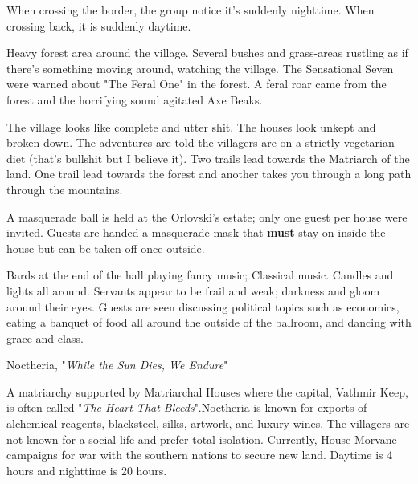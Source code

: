 
When crossing the border, the group notice it's suddenly nighttime. When crossing back, it is suddenly daytime.

	Heavy forest area around the village. Several bushes and grass-areas rustling as if there's something moving around, watching the village. The Sensational Seven were warned about "The Feral One" in the forest. A feral roar came from the forest and the horrifying sound agitated Axe Beaks.
	
The village looks like complete and utter shit. The houses look unkept and broken down. The adventures are told the villagers are on a strictly vegetarian diet (that's bullshit but I believe it). Two trails lead towards the Matriarch of the land. One trail lead towards the forest and another takes you through a long path through the mountains.


	A masquerade ball is held at the Orlovski's estate; only one guest per house were invited. Guests are handed a masquerade mask that \textbf{must} stay on inside the house but can be taken off once outside.
	
	Bards at the end of the hall playing fancy music; Classical music. Candles and lights all around. Servants appear to be frail and weak; darkness and gloom around their eyes. Guests are seen discussing political topics such as economics, eating a banquet of food all around the outside of the ballroom, and dancing with grace and class.
	
\begin{DndSidebar}[float=!b]{Noctheria, "\textit{While the Sun Dies, We Endure}"}

	A matriarchy supported by Matriarchal Houses where the capital, Vathmir Keep, is often called "\textit{The Heart That Bleeds}".Noctheria is known for exports of alchemical reagents, blacksteel, silks, artwork, and luxury wines. The villagers are not known for a social life and prefer total isolation. Currently, House Morvane campaigns for war with the southern nations to secure new land. Daytime is 4 hours and nighttime is 20 hours.
\end{DndSidebar}